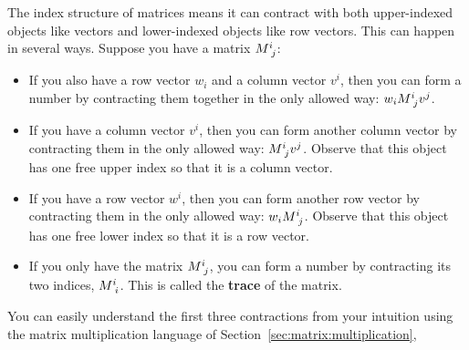 \documentclass[12pt, oneside]{report}    %
\begin{document}
The index structure of matrices means it can contract with both upper-indexed objects like vectors and lower-indexed objects like row vectors. This can happen in several ways. Suppose you have a matrix $M\aij{i}{j}$:
\begin{itemize}
    \item If you also have a row vector $w_i$ and a column vector $v^i$, then you can form a number by contracting them together in the only allowed way: $w_i M\aij{i}{j}v^j$.
    \item If you have a column vector $v^i$, then you can form another column vector by contracting them in the only allowed way: $M\aij{i}{j}v^j$. Observe that this object has one free upper index so that it is a column vector.
    \item If you have a row vector $w^i$, then you can form another row vector by contracting them in the only allowed way: $w_iM\aij{i}{j}$. Observe that this object has one free lower index so that it is a row vector.
    \item If you only have the matrix $M\aij{i}{j}$, you can form a number by contracting its two indices, $M\aij{i}{i}$. This is called the \textbf{trace} of the matrix.
\end{itemize}
You can easily understand the first three contractions from your intuition using the matrix multiplication language of Section~\ref{sec:matrix:multiplication},
\end{document}
